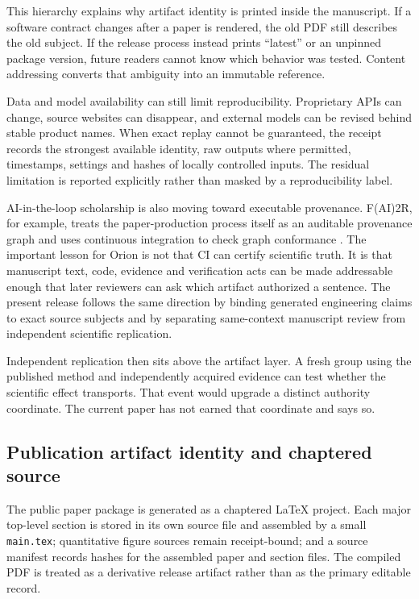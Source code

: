 This hierarchy explains why artifact identity is printed inside the manuscript. If a software contract changes after a paper is rendered, the old PDF still describes the old subject. If the release process instead prints ``latest'' or an unpinned package version, future readers cannot know which behavior was tested. Content addressing converts that ambiguity into an immutable reference.

Data and model availability can still limit reproducibility. Proprietary APIs can change, source websites can disappear, and external models can be revised behind stable product names. When exact replay cannot be guaranteed, the receipt records the strongest available identity, raw outputs where permitted, timestamps, settings and hashes of locally controlled inputs. The residual limitation is reported explicitly rather than masked by a reproducibility label.

AI-in-the-loop scholarship is also moving toward executable provenance. F(AI)2R, for example, treats the paper-production process itself as an auditable provenance graph and uses continuous integration to check graph conformance \cite{krebs2026fair}. The important lesson for Orion is not that CI can certify scientific truth. It is that manuscript text, code, evidence and verification acts can be made addressable enough that later reviewers can ask which artifact authorized a sentence. The present release follows the same direction by binding generated engineering claims to exact source subjects and by separating same-context manuscript review from independent scientific replication.

Independent replication then sits above the artifact layer. A fresh group using the published method and independently acquired evidence can test whether the scientific effect transports. That event would upgrade a distinct authority coordinate. The current paper has not earned that coordinate and says so.

\subsection{Publication artifact identity and chaptered source}

The public paper package is generated as a chaptered \LaTeX{} project. Each major top-level section is stored in its own source file and assembled by a small \texttt{main.tex}; quantitative figure sources remain receipt-bound; and a source manifest records hashes for the assembled paper and section files. The compiled PDF is treated as a derivative release artifact rather than as the primary editable record.

